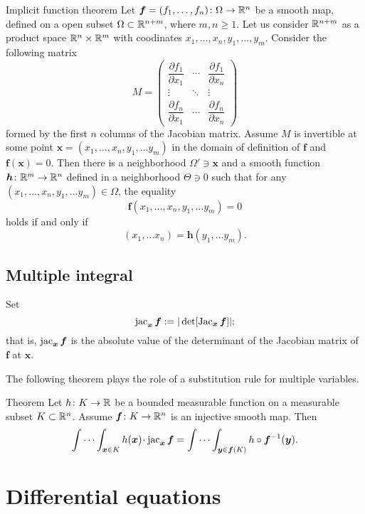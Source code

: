 \begin{thm}{Implicit function theorem}\label{thm:imlicit}
Let $\bm{f}=(f_1,\dots,f_n)\colon\Omega\to\mathbb{R}^n$ be a smooth map, defined on a open subset $\Omega\subset\mathbb{R}^{n+m}$, where
$m,n\ge 1$.
Let us consider $\mathbb{R}^{n+m}$ as a product space $\mathbb{R}^n\times \mathbb{R}^m$ with coodinates 
$x_1,\dots,x_n,y_1,\dots,y_m$.
Consider the following matrix 
\[
M=\begin{pmatrix}
\dfrac{\partial f_1}{\partial x_1} & \cdots & \dfrac{\partial f_1}{\partial x_n}\\
\vdots & \ddots & \vdots\\
\dfrac{\partial f_n}{\partial x_1} & \cdots & \dfrac{\partial f_n}{\partial x_n} \end{pmatrix}\]
formed by the first $n$ columns of the Jacobian matrix.
Assume $M$ is invertible at some point $\bm{x}=(x_1,\dots,x_n,y_1,\dots y_m)$ in the domain of definition of $\bm{f}$ and $\bm{f}(\bm{x})=0$.
Then there is a neighborhood $\Omega'\ni \bm{x}$
and a smooth function $\bm{h}\colon\mathbb{R}^m\to\mathbb{R}^n$ defined in a neighborhood $\Theta\ni 0$ such that
for any $(x_1,\dots,x_n,y_1,\dots y_m)\in \Omega$, the equality
\[\bm{f}(x_1,\dots,x_n,y_1,\dots y_m)=0\]
holds if and only if 
\[(x_1,\dots x_n)=\bm{h}(y_1,\dots y_m).\]

\end{thm}

\subsection*{Multiple integral}

Set 
\[\mathop{\rm jac}\nolimits_{\bm{x}}\bm{f}:=|\det[\mathop{\rm Jac}\nolimits_{\bm{x}}\bm{f}]|;\]
that is, $\mathop{\rm jac}\nolimits_{\bm{x}}\bm{f}$ is the absolute value of the determinant of the Jacobian matrix of $\bm{f}$ at $\bm{x}$.

The following theorem plays the role of a substitution rule for multiple variables.

\begin{thm}{Theorem}\label{thm:mult-substitution}
Let $h\colon K\to\mathbb{R}$ be a bounded measurable function on a measurable subset $K\subset \mathbb{R}^n$.
Assume $\bm{f}\colon K\to \mathbb{R}^n$ is an injective smooth map.
Then 
\[\idotsint_{\bm{x}\in K} h(\bm{x})\cdot \jac_{\bm{x}}\bm{f}
=
\idotsint_{\bm{y}\in \bm{f}(K)} h\circ \bm{f}^{-1}(\bm{y}).\]

\end{thm}




\section{Differential equations}

